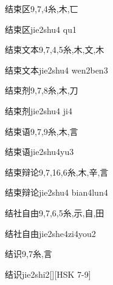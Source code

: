 \begin{Entry}{结束区}{9,7,4}{⽷,⽊,⼖}
  \begin{Phonetics}{结束区}{jie2shu4 qu1}
  \end{Phonetics}
\end{Entry}

\begin{Entry}{结束文本}{9,7,4,5}{⽷,⽊,⽂,⽊}
  \begin{Phonetics}{结束文本}{jie2shu4 wen2ben3}
  \end{Phonetics}
\end{Entry}

\begin{Entry}{结束剂}{9,7,8}{⽷,⽊,⼑}
  \begin{Phonetics}{结束剂}{jie2shu4 ji4}
  \end{Phonetics}
\end{Entry}

\begin{Entry}{结束语}{9,7,9}{⽷,⽊,⾔}
  \begin{Phonetics}{结束语}{jie2shu4yu3}
  \end{Phonetics}
\end{Entry}

\begin{Entry}{结束辩论}{9,7,16,6}{⽷,⽊,⾟,⾔}
  \begin{Phonetics}{结束辩论}{jie2shu4 bian4lun4}
  \end{Phonetics}
\end{Entry}

\begin{Entry}{结社自由}{9,7,6,5}{⽷,⽰,⾃,⽥}
  \begin{Phonetics}{结社自由}{jie2she4zi4you2}
  \end{Phonetics}
\end{Entry}

\begin{Entry}{结识}{9,7}{⽷,⾔}
  \begin{Phonetics}{结识}{jie2shi2}[][HSK 7-9]
  \end{Phonetics}
\end{Entry}

